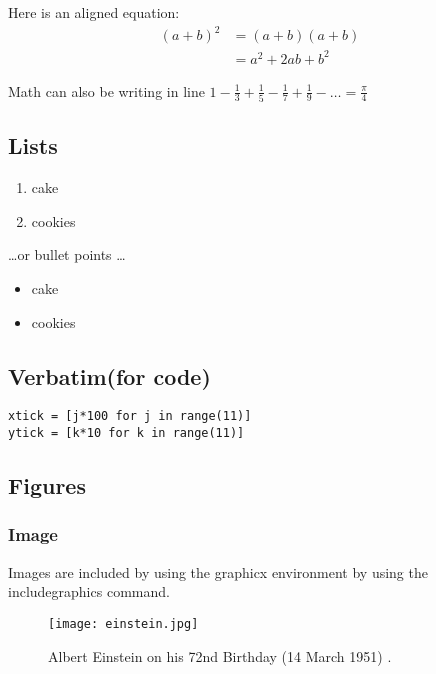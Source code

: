 \documentclass[11pt,a4paper,titlepage]{article}
\begin{document}
Here is an aligned equation:
\begin{align}
(a+b)^2  & = (a+b)(a+b)  \nonumber \\
  & = a^2+2ab+b^2 \label{eq:aplusbexpanded}
\end{align}


Math can also be writing in line $1-\frac{1}{3}+\frac{1}{5}-\frac{1}{7}+\frac{1}{9}-\ldots = \frac{\pi}{4}$

\subsection{Lists}

\begin{enumerate}
\item cake
\item cookies
\end{enumerate}

\dots or bullet points \dots

\begin{itemize}
\item cake
\item cookies
\end{itemize}

\subsection{Verbatim(for code)}

\begin{verbatim}
xtick = [j*100 for j in range(11)]
ytick = [k*10 for k in range(11)]
\end{verbatim}

\subsection{Figures}
\subsubsection{Image}

Images are included by using the graphicx environment by using the includegraphics command.

\begin{figure}[H] %
\centering
\texttt{[image: einstein.jpg]}
\caption{\label{fig:einstein} Albert Einstein on his 72nd Birthday (14 March 1951) \cite{ArthurSasse}.}
\end{figure}
\end{document}

